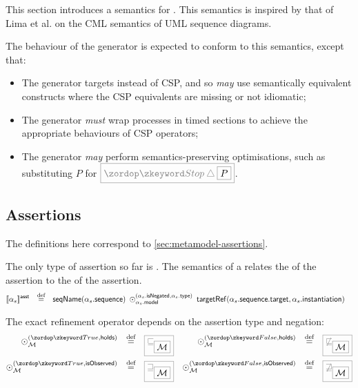 
This section introduces a \tockcsp{} semantics for \langname.
This semantics is inspired by that of Lima et al. on the CML semantics of
UML sequence diagrams.

The behaviour of the \langname{} generator is expected to conform to
this semantics, except that:

\begin{itemize}
\item
	The generator targets \cspm{} instead of CSP, and so \emph{may}
	use semantically equivalent \cspm{} constructs where the CSP equivalents
	are missing or not idiomatic;
\item
	The generator \emph{must}  wrap processes in
	timed sections to achieve the appropriate \tockcsp{} behaviours of
	CSP operators;
\item
	The generator \emph{may} perform semantics-preserving optimisations,
	such as substituting \(P\) for \(\tlang{\Stop \interrupt \olang{P}}\).
\end{itemize}


\subsection{Assertions}

The definitions here correspond to \cref{sec:metamodel-assertions}.

\begin{defn}[\massertion]

\newcommand{\refop}[3]{\mathbin{\odot_{#1}^{(#2, #3)}}}

The only type of assertion so far is \msequenceassertion.  The semantics of a
\msequenceassertion{} relates the \msequence{} of the assertion to the
\mtarget{} of the assertion.
%
\begin{align*}
	\asstsema{\asasst}
\quad\defeq\quad&
	\seqnameOf{\field{\asasst}{sequence}}
	\;
	\refop{\field{\asasst}{model}}{\field{\asasst}{isNegated}}{\field{\asasst}{type}}
	\;
	\targetRef{\field{\field{\asasst}{sequence}}{target}}{\field{\asasst}{instantiation}}
\end{align*}

The exact refinement operator depends on the assertion type and negation:
%
\begin{align*}
	\refop{\amodel}{\true}{\mathsf{holds}}
\quad\defeq\quad&
	\tlang{\sqsubseteq_{\olang{\amodel}}}
&
	\refop{\amodel}{\false}{\mathsf{holds}}
\quad\defeq\quad&
	\tlang{\not\sqsubseteq_{\olang{\amodel}}}
\\
	\refop{\amodel}{\true}{\mathsf{isObserved}}
\quad\defeq\quad&
	\tlang{\sqsupseteq_{\olang{\amodel}}}
&
	\refop{\amodel}{\false}{\mathsf{isObserved}}
\quad\defeq\quad&
	\tlang{\not\sqsupseteq_{\olang{\amodel}}}
\\
\end{align*}
\end{defn}


